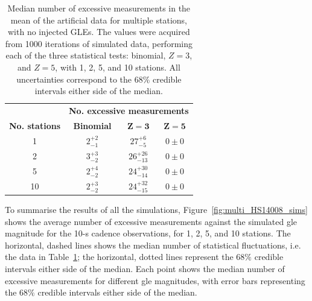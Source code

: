 \begin{table}[ht!]
	\begin{center}
		\caption{Median number of excessive measurements in the mean of the artificial data for multiple stations, with no injected GLEs. The values were acquired from 1000 iterations of simulated data, performing each of the three statistical tests: binomial, $Z=3$, and $Z=5$, with 1, 2, 5, and 10 stations. All uncertainties correspond to the 68\% credible intervals either side of the median.}
		\label{tab:HS_14008_multi_sims_zeros}
		\begin{tabular}{c c c c}
			\hline 
			{} & \multicolumn{3}{c}{\bf No. excessive measurements} \\ 
			{\bf No. stations} & {\bf Binomial} & {\bf $\mathbf{Z=3}$} & {\bf $\mathbf{Z=5}$}  \\ 
			\hline 
			1 & $ 2^{+2}_{-1} $ & $ 27^{+6}_{-5} $ & $ 0 \pm 0 $ \\ 
			2 & $ 3^{+3}_{-2} $ & $ 26^{+26}_{-13} $ & $ 0 \pm 0 $ \\ 
			5 & $ 2^{+4}_{-2} $ & $ 24^{+30}_{-14} $ & $ 0 \pm 0 $ \\ 
			10 & $ 2^{+3}_{-2} $ & $ 24^{+32}_{-15} $ & $ 0 \pm 0 $ \\ 
			\hline 
		\end{tabular} 
	\end{center}
\end{table}
%
%

To summarise the results of all the simulations, Figure~\ref{fig:multi_HS14008_sims} shows the average number of excessive measurements against the simulated \gls{gle} magnitude for the 10-s cadence observations, for 1, 2, 5, and 10 stations. The horizontal, dashed lines shows the median number of statistical fluctuations, i.e. the data in Table~\ref{tab:HS_14008_multi_sims_zeros}; the horizontal, dotted lines represent the $68 \%$ credible intervals either side of the median. Each point shows the median number of excessive measurements for different \gls{gle} magnitudes, with error bars representing the $68 \%$ credible intervals either side of the median.


